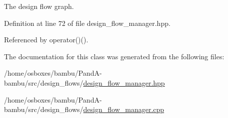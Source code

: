 The design flow graph. 



Definition at line 72 of file design\+\_\+flow\+\_\+manager.\+hpp.



Referenced by operator()().



The documentation for this class was generated from the following files\+:\begin{DoxyCompactItemize}
\item 
/home/osboxes/bambu/\+Pand\+A-\/bambu/src/design\+\_\+flows/\hyperlink{design__flow__manager_8hpp}{design\+\_\+flow\+\_\+manager.\+hpp}\item 
/home/osboxes/bambu/\+Pand\+A-\/bambu/src/design\+\_\+flows/\hyperlink{design__flow__manager_8cpp}{design\+\_\+flow\+\_\+manager.\+cpp}\end{DoxyCompactItemize}
